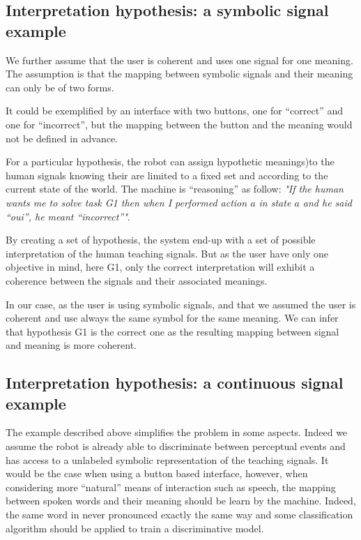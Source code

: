 \subsection{Interpretation hypothesis: a symbolic signal example}

We further assume that the user is coherent and uses one signal for one meaning. The assumption is that the mapping between symbolic signals and their meaning can only be of two forms.

It could be exemplified by an interface with two buttons, one for ``correct'' and one for ``incorrect'', but the mapping between the button and the meaning would not be defined in advance.




For a particular hypothesis, the robot can assign hypothetic meanings)to the human signals knowing their are limited to a fixed set and according to the current state of the world. The machine is ``reasoning'' as follow: \emph{"If the human wants me to solve task G1 then when I performed action $a$ in state $a$ and he said ``oui'', he meant ``incorrect''"}. 


By creating a set of hypothesis, the system end-up with a set of possible interpretation of the human teaching signals. But as the user have only one objective in mind, here G1, only the correct interpretation will exhibit a coherence between the signals and their associated meanings. 

In our case, as the user is using symbolic signals, and that we assumed the user is coherent and use always the same symbol for the same meaning. We can infer that hypothesis G1 is the correct one as the resulting mapping between signal and meaning is more coherent.


\subsection{Interpretation hypothesis: a continuous signal example}

The example described above simplifies the problem in some aspects. Indeed we assume the robot is already able to discriminate between perceptual events and has access to a unlabeled symbolic representation of the teaching signals. It would be the case when using a button based interface, however, when considering more ``natural'' means of interaction such as speech, the mapping between spoken words and their meaning should be learn by the machine. Indeed, the same word in never pronounced exactly the same way and some classification algorithm should be applied to train a discriminative model.


